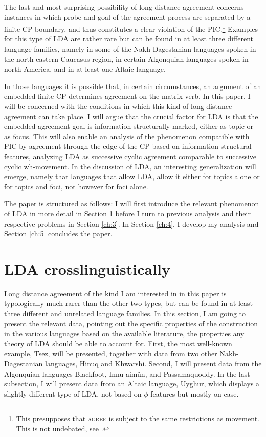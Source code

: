 \documentclass[output=paper
,modfonts
,nonflat]{langsci/langscibook}
\begin{document}
The last and most surprising possibility of long distance agreement concerns instances in which probe and goal of the agreement process are separated by a finite CP boundary, and thus constitutes a clear violation of the PIC.\footnote{This presupposes that \textsc{agree} is subject to the same restrictions as movement. This is not undebated, see \citet{Boskovic2003,Boskovic2007}.} Examples for this type of LDA are rather rare but can be found in at least three different language families, namely in some of the Nakh-Dagestanian languages spoken in the north-eastern Caucasus region, in certain Algonquian languages spoken in north America, and in at least one Altaic language.

In those languages it is possible that, in certain circumstances, an argument of an embedded finite CP determines agreement on the matrix verb. In this paper, I will be concerned with the conditions in which this kind of long distance agreement can take place. I will argue that the crucial factor for LDA is that the embedded agreement goal is information-structurally marked, either as topic or as focus. This will also enable an analysis of the phenomenon compatible with PIC by agreement through the edge of the CP based on information-structural features, analyzing LDA as successive cyclic agreement comparable to successive cyclic wh-movement. In the discussion of LDA, an interesting generalization will emerge, namely that languages that allow LDA, allow it either for topics alone or for topics and foci, not however for foci alone.

\noindent The paper is structured as follows: I will first introduce the relevant phenomenon of LDA in more detail in Section \ref{ch:2} before I turn to previous analysis and their respective problems in Section \ref{ch:3}. In Section \ref{ch:4}, I develop my analysis and Section \ref{ch:5} concludes the paper.

\section{LDA crosslinguistically}
\label{ch:2}

Long distance agreement of the kind I am interested in in this paper is typologically much rarer than the other two types, but can be found in at least three different and unrelated language families. In this section, I am going to present the relevant data, pointing out the specific properties of the construction in the various languages based on the available literature, the properties any theory of LDA should be able to account for. First, the most well-known example, Tsez, will be presented, together with data from two other Nakh-Dagestanian languages, Hinuq and Khwarshi. Second, I will present data from the Algonquian languages Blackfoot, Innu-aim\^{u}n, and Passamaquoddy. In the last subsection, I will present data from an Altaic language, Uyghur, which displays a slightly different type of LDA, not based on $ \phi $-features but mostly on case.
\end{document}
